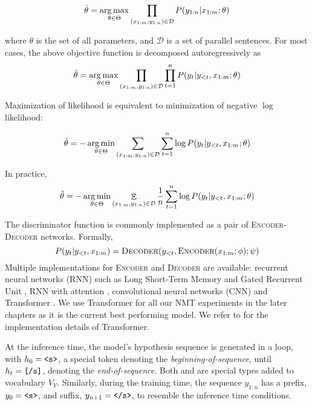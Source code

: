 $$\hat\theta = \operatorname*{arg\,max}_{\theta \in \Theta} \prod_{(x_{1:m}, y_{1:n}) \in \mathcal{D}} P(y_{1:n} | x_{1:m}; \theta)$$

where $\theta$ is the set of all parameters, and $\mathcal{D}$ is a set of parallel sentences.
For most cases, the above objective function is decomposed autoregressively as
$$\hat\theta = \operatorname*{arg\,max}_{\theta \in \Theta} \prod_{(x_{1:m}, y_{1:n}) \in \mathcal{D}} \prod_{t=1}^{n} P(y_t | y_{<t}, x_{1:m}; \theta)$$ 

Maximization of likelihood is equivalent to minimization of negative $\log$ likelihood:

$$\hat\theta = - \operatorname*{arg\,min}_{\theta \in \Theta} \sum_{(x_{1:m}, y_{1:n}) \in \mathcal{D}} \sum_{t=1}^{n} \log P(y_t | y_{<t}, x_{1:m}; \theta)$$

In practice,
$$\hat\theta = - \operatorname*{arg\,min}_{\theta \in \Theta} \mathop{\mathbb{E}}_{(x_{1:m}, y_{1:n}) \in \mathcal{D}} \frac{1}{n} \sum_{t=1}^{n} \log P(y_t | y_{<t}, x_{1:m}; \theta)$$


The discriminator function is commonly implemented as a pair of \textsc{Encoder-Decoder} networks.
Formally,
$$ P(y_t | y_{<t}, x_{1:m}) = \textsc{Decoder}(y_{<t}, \textsc{Encoder}(x_{1:m}; \phi); \psi)$$
Multiple implementations for \textsc{Encoder} and \textsc{Decoder} are available: recurrent neural networks (RNN) such as Long Short-Term Memory \cite{sutskever2014seq2seq,hochreiter1997LSTM} and Gated Recurrent Unit \cite{cho-etal-2014-properties,cho2014learning}, RNN with attention \cite{bahdanau2014nmtattn,luong2015effectiveAttn}, convolutional neural networks (CNN) \cite{gehring2017CNNMT} and Transformer \cite{vaswani-2017-attention}. 
 We use Transformer for all our NMT experiments in the later chapters as it is the current best performing model.
 We refer to \citet{rush-2018-annotated} for the implementation details of Transformer.

At the inference time, the model's hypothesis sequence is generated in a loop, with $h_0=\mbox{\texttt{<s>}}$, a special token denoting the \textit{beginning-of-sequence}, until  $h_t=\mbox{\texttt{[/s]}}$, denoting the \textit{end-of-sequence}. Both  and  are special types added to vocabulary $V_Y$. Similarly, during the training time, the sequence $y_{1:n}$ has a prefix, $y_0=\mbox{\texttt{<s>}}$, and suffix, $y_{n+1}=\mbox{\texttt{</s>}}$, to resemble the inference time conditions.

